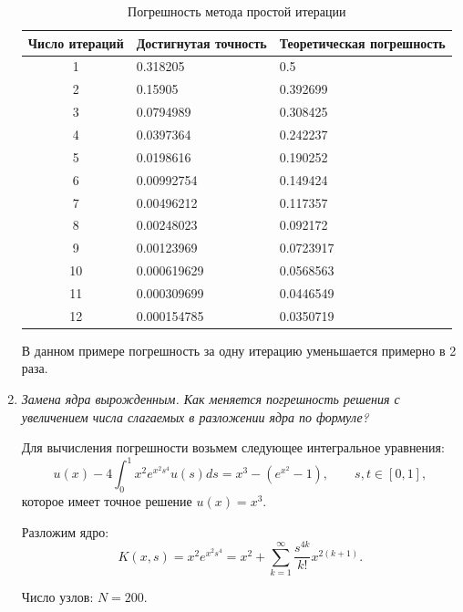 \documentclass[12pt, a4paper]{article}
\begin{document}
\begin{enumerate}
		\begin{table}[H]
			\caption{Погрешность метода простой итерации}
			\centering
			\begin{tabular}{|c|l|l|}
				\hline
				Число итераций & Достигнутая точность & Теоретическая погрешность \\ \hline
				1        & 0.318205             & 0.5                       \\ \hline
				2        & 0.15905              & 0.392699                  \\ \hline
				3        & 0.0794989            & 0.308425                  \\ \hline
				4        & 0.0397364            & 0.242237                  \\ \hline
				5        & 0.0198616            & 0.190252                  \\ \hline
				6        & 0.00992754           & 0.149424                  \\ \hline
				7        & 0.00496212           & 0.117357                  \\ \hline
				8        & 0.00248023           & 0.092172                  \\ \hline
				9        & 0.00123969           & 0.0723917                 \\ \hline
				10       & 0.000619629          & 0.0568563                 \\ \hline
				11       & 0.000309699          & 0.0446549                 \\ \hline
				12       & 0.000154785          & 0.0350719                 \\ \hline
			\end{tabular}
		\end{table}
		
		В данном примере погрешность за одну итерацию уменьшается примерно в 2 раза.
		
		\item \textit{Замена ядра вырожденным. Как меняется погрешность решения с увеличением числа слагаемых в разложении ядра по формуле?}
		
		Для вычисления погрешности возьмем следующее интегральное уравнения:
		\[
		u(x)-4\int_0^1 x^2 e^{x^2 s^4} u(s) ds = x^3 - (e^{x^2}-1), \qquad s, t \in [0, 1],
		\]
		которое имеет  точное решение $u(x) = x^3$.
		
		Разложим ядро:
		\[
		K(x, s) = x^2 e^{x^2 s^4} = x^2 + \sum_{k=1}^\infty \frac{s^{4k}}{k!} x^{2(k+1)}.
		\]
		
		Число узлов: $N = 200$.
		

\end{enumerate}
\end{document}
